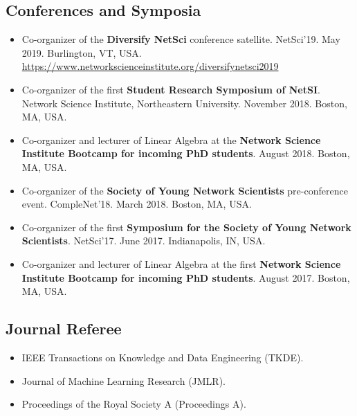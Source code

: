 \documentclass[12pt,]{scrartcl}
\begin{document}
\subsection{Conferences and Symposia}\label{conferences}

\begin{itemize}
\leftskip-0.25in

\item Co-organizer of the \textbf{Diversify NetSci} conference satellite. NetSci'19. May 2019. Burlington, VT, USA. \url{https://www.networkscienceinstitute.org/diversifynetsci2019}

\item Co-organizer of the first \textbf{Student Research Symposium of NetSI}. Network Science Institute, Northeastern University. November 2018. Boston, MA, USA.

\item Co-organizer and lecturer of Linear Algebra at the \textbf{Network Science Institute Bootcamp for incoming PhD students}. August 2018. Boston, MA, USA.

\item Co-organizer of the \textbf{Society of Young Network Scientists} pre-conference event. CompleNet'18. March 2018. Boston, MA, USA.

\item Co-organizer of the first \textbf{Symposium for the Society of Young Network Scientists}. NetSci'17. June 2017. Indianapolis, IN, USA.

\item Co-organizer and lecturer of Linear Algebra at the first \textbf{Network Science Institute Bootcamp for incoming PhD students}. August 2017. Boston, MA, USA.

\end{itemize}


\subsection{Journal Referee}\label{journal-referee}

\begin{itemize}
\leftskip-0.25in

\item IEEE Transactions on Knowledge and Data Engineering (TKDE).

\item Journal of Machine Learning Research (JMLR).

\item Proceedings of the Royal Society A (Proceedings A).

\end{itemize}
\end{document}
